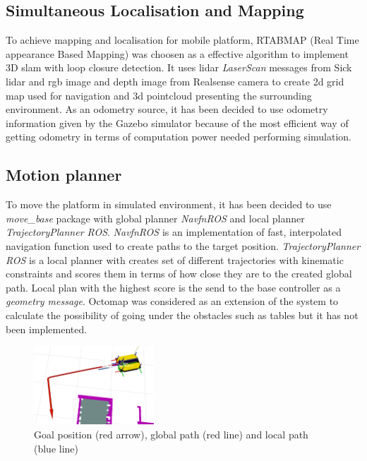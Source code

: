 \documentclass[conference,a4paper]{IEEEtran}
\begin{document}
\subsection{Simultaneous Localisation and Mapping}
To achieve mapping and localisation for mobile platform, RTABMAP (Real Time appearance Based Mapping) \cite{RTABMAP} was choosen as a effective algorithm to implement 3D slam with loop closure detection. It uses lidar \textit{LaserScan} messages from Sick lidar and rgb image and depth image from Realsense camera to create 2d grid map used for navigation and 3d pointcloud presenting the surrounding environment. 
As an odometry source, it has been decided to use odometry information given by the Gazebo simulator because of the most efficient way of getting odometry in terms of computation power needed performing simulation.

\subsection{Motion planner}
To move the platform in simulated environment, it has been decided to use \textit{move\_base} package with global planner \textit{NavfnROS} and local planner \textit{TrajectoryPlanner ROS}. \textit{NavfnROS} is an implementation of fast, interpolated navigation function used to create paths to the target position.  \textit{TrajectoryPlanner ROS} is a local planner with creates set of different trajectories with kinematic constraints
and scores them in terms of how close they are to the created global path. Local plan with the highest score is the send to the base controller as a \textit{geometry message}.
Octomap was considered as an extension of the system to calculate the possibility of going under the obstacles such as tables but it has not been implemented. 

\begin{figure}[ht]
  \centering
  \includegraphics[width=0.4\textwidth]{img/global_local_planner.png}
  \caption[global and local path]{Goal position (red arrow), global path (red line) and local path (blue line)}
\end{figure}
\FloatBarrier
\end{document}
